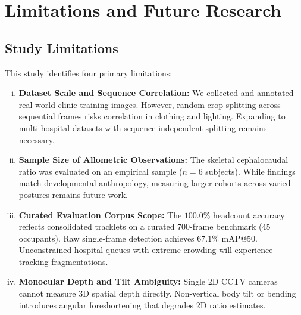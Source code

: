 \section{Limitations and Future Research}

\subsection{Study Limitations}
This study identifies four primary limitations:
\begin{enumerate}[(i)]
    \item \textbf{Dataset Scale and Sequence Correlation:} We collected and annotated real-world clinic training images. However, random crop splitting across sequential frames risks correlation in clothing and lighting. Expanding to multi-hospital datasets with sequence-independent splitting remains necessary.
    \item \textbf{Sample Size of Allometric Observations:} The skeletal cephalocaudal ratio was evaluated on an empirical sample ($n=6$ subjects). While findings match developmental anthropology, measuring larger cohorts across varied postures remains future work.
    \item \textbf{Curated Evaluation Corpus Scope:} The $100.0\%$ headcount accuracy reflects consolidated tracklets on a curated 700-frame benchmark (45 occupants). Raw single-frame detection achieves $67.1\%$ mAP@50. Unconstrained hospital queues with extreme crowding will experience tracking fragmentations.
    \item \textbf{Monocular Depth and Tilt Ambiguity:} Single 2D CCTV cameras cannot measure 3D spatial depth directly. Non-vertical body tilt or bending introduces angular foreshortening that degrades 2D ratio estimates.
\end{enumerate}

